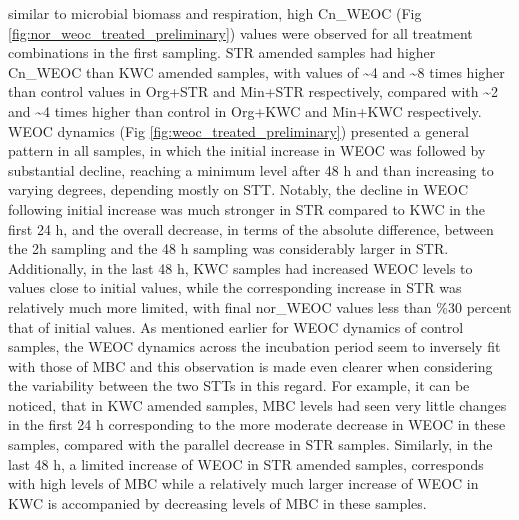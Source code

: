 \documentclass[12pt]{report}
\begin{document}
		similar to microbial biomass and respiration, high Cn\_WEOC (Fig \ref{fig:nor_weoc_treated_preliminary}) values were observed for all treatment combinations in the first sampling. STR amended samples had higher Cn\_WEOC than KWC amended samples, with values of \~{}4 and \~{}8 times higher than control values in Org+STR and Min+STR respectively, compared with \~{}2 and \~{}4 times higher than control in Org+KWC and Min+KWC respectively. WEOC dynamics (Fig \ref{fig:weoc_treated_preliminary}) presented a general pattern in all samples, in which the initial increase in WEOC was followed by substantial decline, reaching a minimum level after 48 h and than increasing to varying degrees, depending mostly on STT.  Notably, the decline in WEOC following initial increase was much stronger in STR compared to KWC in the first 24 h, and the overall decrease, in terms of the absolute difference, between the 2h sampling and the 48 h sampling was considerably larger in STR. Additionally, in the last 48 h, KWC samples had increased WEOC levels to values close to initial values, while the corresponding increase in STR was relatively much more limited, with final nor\_WEOC values less than \%30 percent that of initial values. As mentioned earlier for WEOC dynamics of control samples, the WEOC dynamics across the incubation period seem to inversely fit with those of MBC and this observation is made even clearer when considering the variability between the two STTs in this regard. For example, it can be noticed, that in KWC amended samples, MBC levels had seen very little changes in the first 24 h corresponding to the more moderate decrease in WEOC in these samples, compared with the parallel  decrease in STR samples. Similarly, in the last 48 h, a limited increase of WEOC in STR amended samples, corresponds with high levels of MBC while a relatively much larger increase of WEOC in KWC is accompanied by decreasing levels of MBC in these samples.
		
\end{document}
